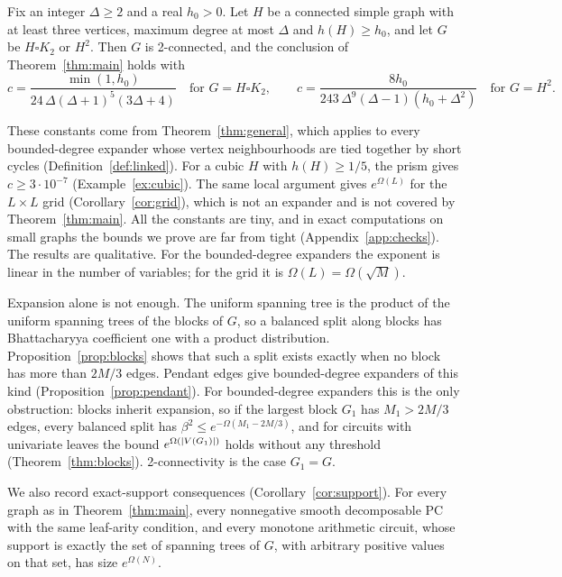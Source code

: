 \begin{corollary}\label{cor:prism-square}
Fix an integer $\Delta\ge2$ and a real $h_0>0$. Let $H$ be a connected simple graph with at least three vertices, maximum degree at most $\Delta$ and $h(H)\ge h_0$, and let $G$ be $H\square K_2$ or $H^2$. Then $G$ is 2-connected, and the conclusion of Theorem~\ref{thm:main} holds with
\[
  c=\frac{\min(1,h_0)}{24\,\Delta(\Delta+1)^5(3\Delta+4)}\quad\text{for }G=H\square K_2,\qquad
  c=\frac{8h_0}{243\,\Delta^{9}(\Delta-1)(h_0+\Delta^2)}\quad\text{for }G=H^2 .
\]
\end{corollary}

These constants come from Theorem~\ref{thm:general}, which applies to every bounded-degree expander whose vertex neighbourhoods are tied together by short cycles (Definition~\ref{def:linked}). For a cubic $H$ with $h(H)\ge1/5$, the prism gives $c\ge3\cdot10^{-7}$ (Example~\ref{ex:cubic}). The same local argument gives $e^{\Omega(L)}$ for the $L\times L$ grid (Corollary~\ref{cor:grid}), which is not an expander and is not covered by Theorem~\ref{thm:main}. All the constants are tiny, and in exact computations on small graphs the bounds we prove are far from tight (Appendix~\ref{app:checks}). The results are qualitative. For the bounded-degree expanders the exponent is linear in the number of variables; for the grid it is $\Omega(L)=\Omega(\sqrt M)$.

Expansion alone is not enough. The uniform spanning tree is the product of the uniform spanning trees of the blocks of $G$, so a balanced split along blocks has Bhattacharyya coefficient one with a product distribution. Proposition~\ref{prop:blocks} shows that such a split exists exactly when no block has more than $2M/3$ edges. Pendant edges give bounded-degree expanders of this kind (Proposition~\ref{prop:pendant}). For bounded-degree expanders this is the only obstruction: blocks inherit expansion, so if the largest block $G_1$ has $M_1>2M/3$ edges, every balanced split has $\beta^2\le e^{-\Omega(M_1-2M/3)}$, and for circuits with univariate leaves the bound $e^{\Omega(\lvert V(G_1)\rvert)}$ holds without any threshold (Theorem~\ref{thm:blocks}). 2-connectivity is the case $G_1=G$.

We also record exact-support consequences (Corollary~\ref{cor:support}). For every graph as in Theorem~\ref{thm:main}, every nonnegative smooth decomposable PC with the same leaf-arity condition, and every monotone arithmetic circuit, whose support is exactly the set of spanning trees of $G$, with arbitrary positive values on that set, has size $e^{\Omega(N)}$.

